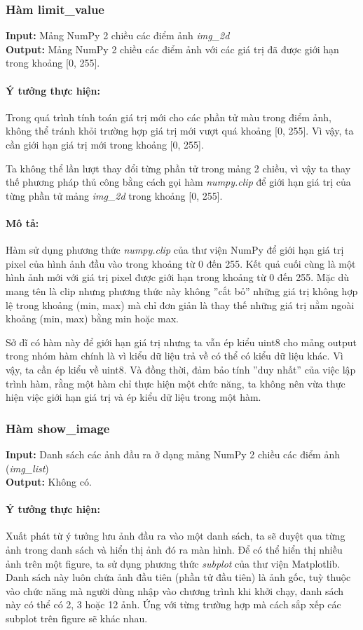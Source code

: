 \documentclass[]{article}
\begin{document}
\subsubsection{Hàm limit\_value}
\textbf{Input:} Mảng NumPy 2 chiều các điểm ảnh \textit{img\_2d} \\
\textbf{Output:} Mảng NumPy 2 chiều các điểm ảnh với các giá trị đã được giới hạn trong khoảng [0, 255].

\paragraph{Ý tưởng thực hiện:} Trong quá trình tính toán giá trị mới cho các phần tử màu trong điểm ảnh, không thể tránh khỏi trường hợp giá trị mới vượt quá khoảng [0, 255]. Vì vậy, ta cần giới hạn giá trị mới trong khoảng [0, 255]. \par
Ta không thể lần lượt thay đổi từng phần tử trong mảng 2 chiều, vì vậy ta thay thế phương pháp thủ công bằng cách gọi hàm \textit{numpy.clip} để giới hạn giá trị của từng phần tử mảng \textit{img\_2d} trong khoảng [0, 255].
\paragraph{Mô tả:} Hàm sử dụng phương thức \textit{numpy.clip} của thư viện NumPy để giới hạn giá trị pixel của hình ảnh đầu vào trong khoảng từ 0 đến 255. Kết quả cuối cùng là một hình ảnh mới với giá trị pixel được giới hạn trong khoảng từ 0 đến 255. Mặc dù mang tên là clip nhưng phương thức này không ''cắt bỏ'' những giá trị không hợp lệ trong khoảng (min, max) mà chỉ đơn giản là thay thế những giá trị nằm ngoài khoảng (min, max) bằng min hoặc max. \par
Sở dĩ có hàm này để giới hạn giá trị nhưng ta vẫn ép kiểu uint8 cho mảng output trong nhóm hàm chính là vì kiểu dữ liệu trả về có thể có kiểu dữ liệu khác. Vì vậy, ta cần ép kiểu về uint8. Và đồng thời, đảm bảo tính ''duy nhất'' của việc lập trình hàm, rằng một hàm chỉ thực hiện một chức năng, ta không nên vừa thực hiện việc giới hạn giá trị và ép kiểu dữ liệu trong một hàm. 
\subsubsection{Hàm show\_image}
\textbf{Input:} Danh sách các ảnh đầu ra ở dạng mảng NumPy 2 chiều các điểm ảnh (\textit{img\_list}) \\
\textbf{Output:} Không có.

\paragraph{Ý tưởng thực hiện:} Xuất phát từ ý tưởng lưu ảnh đầu ra vào một danh sách, ta sẽ duyệt qua từng ảnh trong danh sách và hiển thị ảnh đó ra màn hình. Để có thể hiển thị nhiều ảnh trên một figure, ta sử dụng phương thức \textit{subplot} của thư viện Matplotlib. Danh sách này luôn chứa ảnh đầu tiên (phần tử đầu tiên) là ảnh gốc, tuỳ thuộc vào chức năng mà người dùng nhập vào chương trình khi khởi chạy, danh sách này có thể có 2, 3 hoặc 12 ảnh. Ứng với từng trường hợp mà cách sắp xếp các subplot trên figure sẽ khác nhau.  
\end{document}
